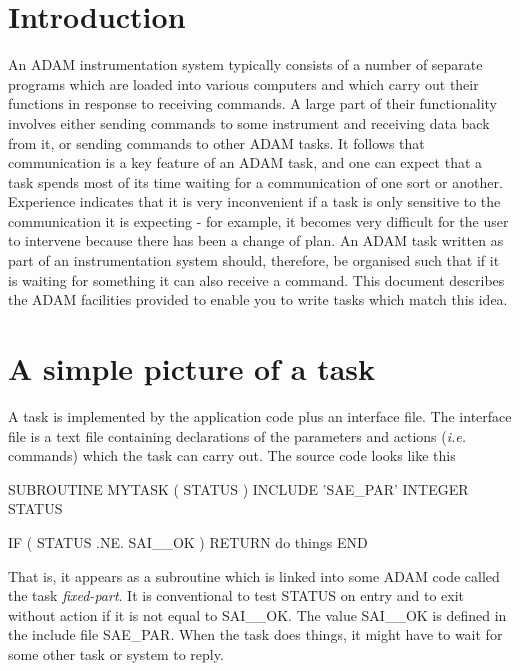 \documentclass[twoside,11pt,nolof]{starlink}
\begin{document}
\scfrontmatter

\section{Introduction}

An ADAM instrumentation system typically consists of a number of
separate programs which are loaded into various computers and which
carry out their functions in response to receiving commands. A large part
of their functionality involves either sending commands to some
instrument and receiving data back from it, or sending commands to other
ADAM tasks. It follows that communication is a key feature of an ADAM
task, and one can expect that a task spends most of its time waiting for
a communication of one sort or another. Experience indicates that it is
very inconvenient if a task is only sensitive to the communication it is
expecting - for example, it becomes very difficult for the user to
intervene because there has been a change of plan. An ADAM task written
as part of an instrumentation system should, therefore, be organised
such that if it is waiting for something it can also receive a command.
This document describes the ADAM facilities provided to enable you to
write tasks which match this idea.

\section{A simple picture of a task}

A task is implemented by the application code plus an interface file.
The interface file is a text file containing declarations of the
parameters and actions (\emph{i.e.} commands) which the task can carry out. The
source code looks like this
\begin{small}
\begin{terminalv}
      SUBROUTINE MYTASK ( STATUS )
      INCLUDE 'SAE_PAR'
      INTEGER STATUS

      IF ( STATUS .NE. SAI__OK ) RETURN
        do things
      END
\end{terminalv}
\end{small}

That is, it appears as a subroutine which is linked into some ADAM code
called the task \emph{fixed-part}.
It is conventional to test STATUS on entry and to exit without action if it
is not equal to SAI\_\_OK. The value SAI\_\_OK is defined in the include file
SAE\_PAR.
When the task does things, it might have to wait for some other task or
system to reply.
\end{document}
